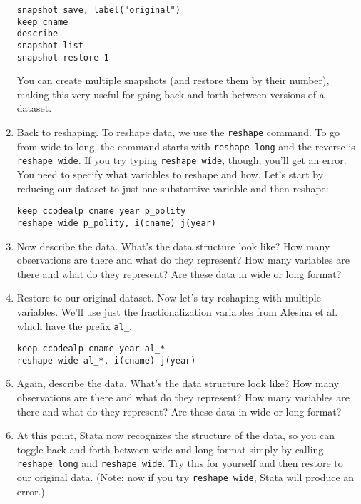\documentclass[a4paper,12pt]{article}
\begin{document}
\begin{enumerate}
\begin{verbatim}
snapshot save, label("original")
keep cname
describe
snapshot list
snapshot restore 1
\end{verbatim}

\noindent You can create multiple snapshots (and restore them by their number), making this very useful for going back and forth between versions of a dataset.

\item Back to reshaping. To reshape data, we use the \texttt{reshape} command. To go from wide to long, the command starts with \texttt{reshape long} and the reverse is \texttt{reshape wide}. If you try typing \texttt{reshape wide}, though, you'll get an error. You need to specify what variables to reshape and how. Let's start by reducing our dataset to just one substantive variable and then reshape:

\begin{verbatim}
keep ccodealp cname year p_polity
reshape wide p_polity, i(cname) j(year)
\end{verbatim}

\item Now describe the data. What's the data structure look like? How many observations are there and what do they represent? How many variables are there and what do they represent? Are these data in wide or long format?

\item Restore to our original dataset. Now let's try reshaping with multiple variables. We'll use just the fractionalization variables from Alesina et al. which have the prefix \texttt{al\_}.


\begin{verbatim}
keep ccodealp cname year al_*
reshape wide al_*, i(cname) j(year)
\end{verbatim}

\item Again, describe the data. What's the data structure look like? How many observations are there and what do they represent? How many variables are there and what do they represent? Are these data in wide or long format?

\item At this point, Stata now recognizes the structure of the data, so you can toggle back and forth between wide and long format simply by calling \texttt{reshape long} and \texttt{reshape wide}. Try this for yourself and then restore to our original data. (Note: now if you try \texttt{reshape wide}, Stata will produce an error.)


\end{enumerate}
\end{document}
